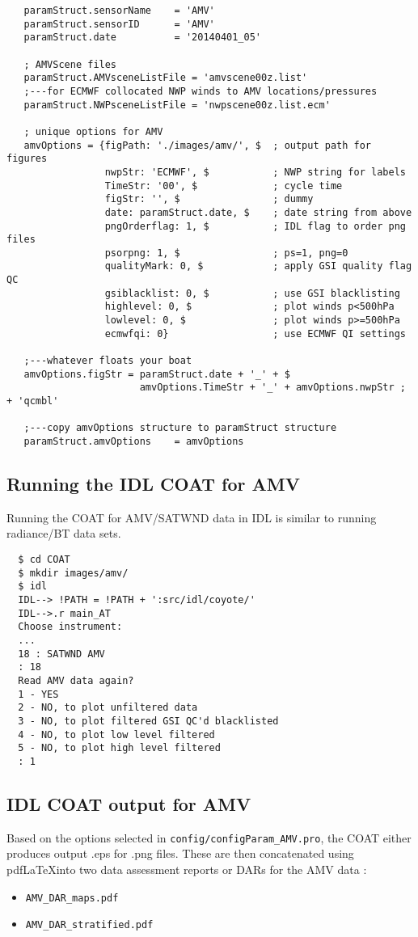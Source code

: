 \documentclass[10pt]{report}
\begin{document}
\begin{appendices}
\begin{verbatim}
   paramStruct.sensorName    = 'AMV'
   paramStruct.sensorID      = 'AMV'
   paramStruct.date          = '20140401_05'

   ; AMVScene files
   paramStruct.AMVsceneListFile = 'amvscene00z.list'
   ;---for ECMWF collocated NWP winds to AMV locations/pressures
   paramStruct.NWPsceneListFile = 'nwpscene00z.list.ecm'

   ; unique options for AMV
   amvOptions = {figPath: './images/amv/', $  ; output path for figures
                 nwpStr: 'ECMWF', $           ; NWP string for labels
                 TimeStr: '00', $             ; cycle time
                 figStr: '', $                ; dummy
                 date: paramStruct.date, $    ; date string from above
                 pngOrderflag: 1, $           ; IDL flag to order png files
                 psorpng: 1, $                ; ps=1, png=0
                 qualityMark: 0, $            ; apply GSI quality flag QC
                 gsiblacklist: 0, $           ; use GSI blacklisting 
                 highlevel: 0, $              ; plot winds p<500hPa
                 lowlevel: 0, $               ; plot winds p>=500hPa
                 ecmwfqi: 0}                  ; use ECMWF QI settings

   ;---whatever floats your boat
   amvOptions.figStr = paramStruct.date + '_' + $
                       amvOptions.TimeStr + '_' + amvOptions.nwpStr ;  + 'qcmbl'

   ;---copy amvOptions structure to paramStruct structure
   paramStruct.amvOptions    = amvOptions
\end{verbatim}  
\subsection{Running the IDL COAT for AMV}
Running the COAT for AMV/SATWND data in IDL is similar to running radiance/BT data sets.  
\begin{verbatim}
  $ cd COAT
  $ mkdir images/amv/
  $ idl
  IDL--> !PATH = !PATH + ':src/idl/coyote/'
  IDL-->.r main_AT
  Choose instrument:
  ...
  18 : SATWND AMV
  : 18
  Read AMV data again?
  1 - YES
  2 - NO, to plot unfiltered data
  3 - NO, to plot filtered GSI QC'd blacklisted
  4 - NO, to plot low level filtered
  5 - NO, to plot high level filtered
  : 1
\end{verbatim}
\subsection{IDL COAT output for AMV}
Based on the options selected in {\tt config/configParam\_AMV.pro}, the COAT either
produces output .eps for .png files.  These are then concatenated using 
pdf\LaTeX into two data assessment reports or DARs for the AMV data :
\begin{itemize}
  \item {\tt AMV\_DAR\_maps.pdf}
  \item {\tt AMV\_DAR\_stratified.pdf}
\end{itemize}

\end{appendices}
\end{document}
